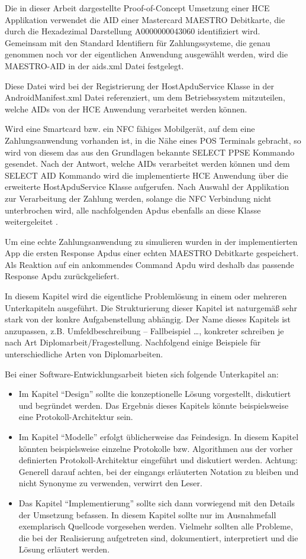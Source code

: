 Die in dieser Arbeit dargestellte Proof-of-Concept Umsetzung einer HCE Applikation verwendet die AID einer Mastercard MAESTRO Debitkarte, die durch die Hexadezimal Darstellung A0000000043060 identifiziert wird. Gemeinsam mit den Standard Identifiern für Zahlungssysteme, die genau genommen noch vor der eigentlichen Anwendung ausgewählt werden, wird die MAESTRO-AID in der aids.xml Datei festgelegt. 

Diese Datei wird bei der Registrierung der HostApduService Klasse in der AndroidManifest.xml Datei referenziert, um dem Betriebssystem mitzuteilen, welche AIDs von der HCE Anwendung verarbeitet werden können. 

Wird eine Smartcard bzw. ein NFC fähiges Mobilgerät, auf dem eine Zahlungsanwendung vorhanden ist, in die Nähe eines POS Terminals gebracht, so wird von diesem das aus den Grundlagen bekannte SELECT PPSE Kommando gesendet. Nach der Antwort, welche AIDs verarbeitet werden können und dem SELECT AID Kommando wird die implementierte HCE Anwendung über die erweiterte HostApduService Klasse aufgerufen. 
Nach Auswahl der Applikation zur Verarbeitung der Zahlung werden, solange die NFC Verbindung nicht unterbrochen wird, alle nachfolgenden Apdus ebenfalls an diese Klasse weitergeleitet \cite{androidHce}. 

Um eine echte Zahlungsanwendung zu simulieren wurden in der implementierten App die ersten Response Apdus einer echten MAESTRO Debitkarte gespeichert. Als Reaktion auf ein ankommendes Command Apdu wird deshalb das passende Response Apdu zurückgeliefert. 


In diesem Kapitel wird die eigentliche Problemlösung in einem oder mehreren Unterkapiteln ausgeführt. Die Strukturierung dieser Kapitel ist naturgemäß sehr stark von der konkre Aufgabenstellung abhängig. Der Name dieses Kapitels ist anzupassen, z.B. Umfeldbeschreibung -- Fallbeispiel \dots, konkreter schreiben je nach Art Diplomarbeit/Fragestellung.
\makeatletter\ifthesis@masterthesis
Nachfolgend einige Beispiele für unterschiedliche Arten von Diplomarbeiten.

Bei einer Software-Entwicklungsarbeit bieten sich folgende Unterkapitel an:
\begin{itemize}
	\item Im Kapitel \enquote{Design} sollte die konzeptionelle Lösung vorgestellt, diskutiert und begründet werden. Das Ergebnis dieses Kapitels könnte beispielsweise eine Protokoll-Architektur sein.
	\item Im Kapitel \enquote{Modelle} erfolgt üblicherweise das Feindesign. In diesem Kapitel könnten beispielsweise einzelne Protokolle bzw. Algorithmen aus der vorher definierten Protokoll-Architektur eingeführt und diskutiert werden. Achtung: Generell darauf achten, bei der eingangs erläuterten Notation zu bleiben und nicht Synonyme zu verwenden, verwirrt den Leser.
	\item Das Kapitel \enquote{Implementierung} sollte sich dann vorwiegend mit den Details der Umsetzung befassen. In diesem Kapitel sollte nur im Ausnahmefall exemplarisch Quellcode vorgesehen werden. Vielmehr sollten alle Probleme, die bei der Realisierung aufgetreten sind, dokumentiert, interpretiert und die Lösung erläutert werden.
\end{itemize}

